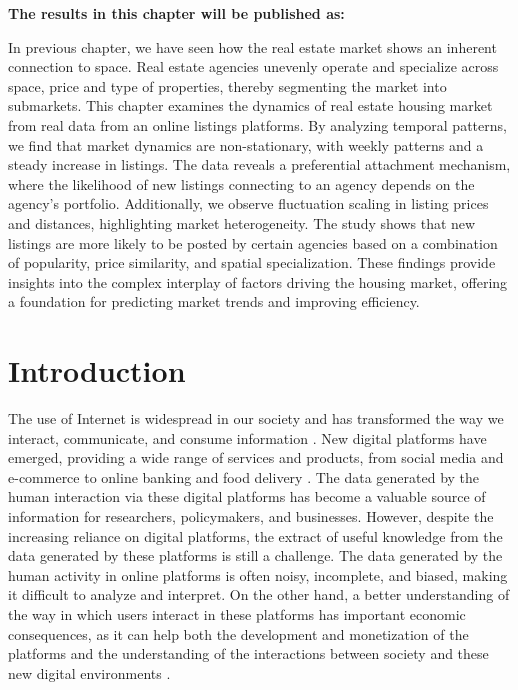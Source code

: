 \vspace{-1.5cm}
\small
\textbf{The results in this chapter will be published as:}
\vspace{0.05 cm}

\normalsize
\vspace{0.5 cm}

In previous chapter, we have seen how the real estate market shows an inherent connection to space. Real estate agencies unevenly operate and specialize across space, price and type of properties, thereby segmenting the market into submarkets. This chapter examines the dynamics of real estate housing market from real data from an online listings platforms. By analyzing temporal patterns, we find that market dynamics are non-stationary, with weekly patterns and a steady increase in listings. The data reveals a preferential attachment mechanism, where the likelihood of new listings connecting to an agency depends on the agency's portfolio. Additionally, we observe fluctuation scaling in listing prices and distances, highlighting market heterogeneity. The study shows that new listings are more likely to be posted by certain agencies based on a combination of popularity, price similarity, and spatial specialization. These findings provide insights into the complex interplay of factors driving the housing market, offering a foundation for predicting market trends and improving efficiency.

\section{Introduction}

The use of Internet is widespread in our society and has transformed the way we interact, communicate, and consume information \cite{berners-lee-2006,dorogovtsev2002evolution,pastor-satorras-2004,watts-2007}. New digital platforms have emerged, providing a wide range of services and products, from social media and e-commerce to online banking and food delivery \cite{unknown-author-2013}. The data generated by the human interaction via these digital platforms has become a valuable source of information for researchers, policymakers, and businesses. However, despite the increasing reliance on digital platforms, the extract of useful knowledge from the data generated by these platforms is still a challenge. The data generated by the human activity in online platforms is often noisy, incomplete, and biased, making it difficult to analyze and interpret. On the other hand, a better understanding of the way in which users interact in these platforms has important economic consequences, as it can help both the development and monetization of the platforms and the understanding of the interactions between society and these new digital environments \cite{choudary-2016}.

